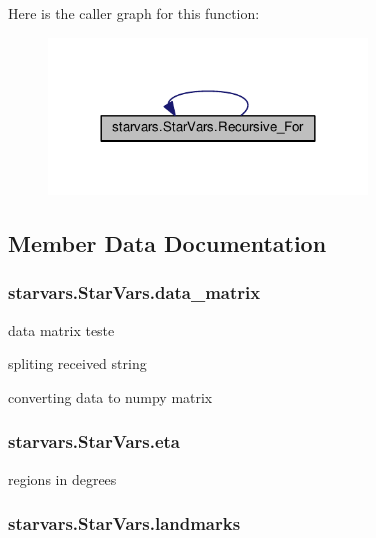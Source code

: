Here is the caller graph for this function\-:\nopagebreak
\begin{figure}[H]
\begin{center}
\leavevmode
\includegraphics[width=240pt]{classstarvars_1_1StarVars_ad9148407d0cb17d568776803518cc611_icgraph}
\end{center}
\end{figure}




\subsection{Member Data Documentation}
\hypertarget{classstarvars_1_1StarVars_a0deb0b64b74ef8f10a7941f042741db4}{
\subsubsection[{data\-\_\-matrix}]{\setlength{\rightskip}{0pt plus 5cm}starvars.\-Star\-Vars.\-data\-\_\-matrix}}\label{classstarvars_1_1StarVars_a0deb0b64b74ef8f10a7941f042741db4}


data matrix teste 

spliting received string

converting data to numpy matrix \hypertarget{classstarvars_1_1StarVars_a6ea108f66bbd8f5744dc15dac70905a7}{
\subsubsection[{eta}]{\setlength{\rightskip}{0pt plus 5cm}starvars.\-Star\-Vars.\-eta}}\label{classstarvars_1_1StarVars_a6ea108f66bbd8f5744dc15dac70905a7}


regions in degrees 

\hypertarget{classstarvars_1_1StarVars_a8e56638a942f24a9929b50ad895db412}{
\subsubsection[{landmarks}]{\setlength{\rightskip}{0pt plus 5cm}starvars.\-Star\-Vars.\-landmarks}}\label{classstarvars_1_1StarVars_a8e56638a942f24a9929b50ad895db412}


